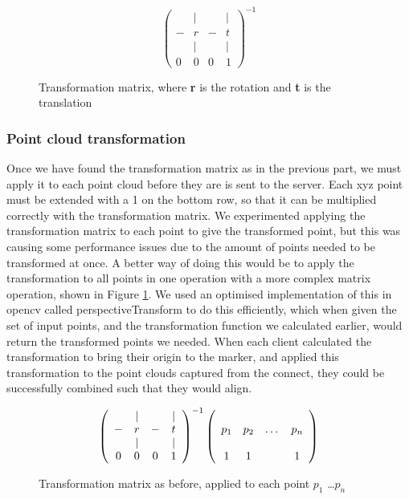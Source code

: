 \documentclass{article}
\begin{document}
\begin{figure}[h]
  \[\left(\begin{array}{cccc}
      & | &   & | \\
    - & r & - & t \\ 
      & | &   & | \\
    0 & 0 & 0 & 1
    \end{array}\right)^{-1}\]
  \caption{Transformation matrix, where \textbf{r} is the rotation and \textbf{t} is the translation}
  \label{fig:transformationMatrix}
\end{figure}

\subsubsection{Point cloud transformation}
Once we have found the transformation matrix as in the previous part, we must apply it to each point cloud before they are is sent to the server. Each xyz point must be extended with a 1 on the bottom row, so that it can be multiplied correctly with the transformation matrix. We experimented applying the transformation matrix to each point to give the transformed point, but this was causing some performance issues due to the amount of points needed to be transformed at once. A better way of doing this would be to apply the transformation to all points in one operation with a more complex matrix operation, shown in Figure \ref{fig:transformationMatrix}. We used an optimised implementation of this in opencv called perspectiveTransform to do this efficiently, which when given the set of input points, and the transformation function we calculated earlier, would return the transformed points we needed. When each client calculated the transformation to bring their origin to the marker, and applied this transformation to the point clouds captured from the connect, they could be successfully combined such that they would align.\\
\begin{figure}[h]
  \[\left(\begin{array}{cccc}
      & | &   & | \\
    - & r & - & t \\ 
      & | &   & | \\
    0 & 0 & 0 & 1
    \end{array}\right)^{-1}
  \left(\begin{array}{cccc}
    \multirow{3}{*}{\textbf{$p_1$}} & \multirow{3}{*}{\textbf{$p_2$}} & \multirow{3}{*}{\dots} & \multirow{3}{*}{\textbf{$p_n$}} \\
    & & & \\
    & & & \\
    1 & 1 & & 1
    \end{array}\right)\]
  \caption{Transformation matrix as before, applied to each point $p_1$ \dots $p_n$}
  \label{fig:transformationApplication}
\end{figure}
\newpage
\end{document}
